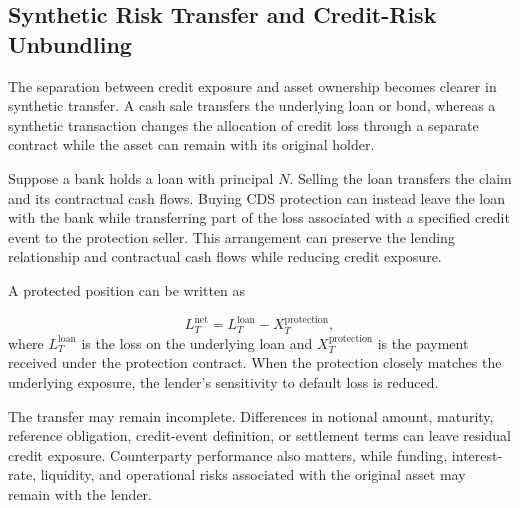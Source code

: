 \subsection[Synthetic Risk Transfer and Credit-Risk Unbundling]{Synthetic Risk Transfer and Credit-Risk Unbundling}

The separation between credit exposure and asset ownership becomes clearer in synthetic transfer. A cash sale transfers the underlying loan or bond, whereas a synthetic transaction changes the allocation of credit loss through a separate contract while the asset can remain with its original holder.

Suppose a bank holds a loan with principal \(N\). Selling the loan transfers the claim and its contractual cash flows. Buying CDS protection can instead leave the loan with the bank while transferring part of the loss associated with a specified credit event to the protection seller. This arrangement can preserve the lending relationship and contractual cash flows while reducing credit exposure.

A protected position can be written as

\begin{equation}
L_T^{\mathrm{net}}
=L_T^{\mathrm{loan}}-
X_T^{\mathrm{protection}},
\label{eq:ch19-synthetic-transfer}
\end{equation}
where \(L_T^{\mathrm{loan}}\) is the loss on the underlying loan and \(X_T^{\mathrm{protection}}\) is the payment received under the protection contract. When the protection closely matches the underlying exposure, the lender's sensitivity to default loss is reduced.

The transfer may remain incomplete. Differences in notional amount, maturity, reference obligation, credit-event definition, or settlement terms can leave residual credit exposure. Counterparty performance also matters, while funding, interest-rate, liquidity, and operational risks associated with the original asset may remain with the lender.

